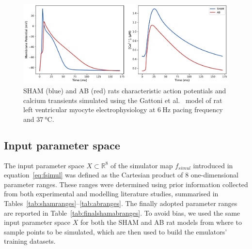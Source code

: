 \begin{figure}[ht!]
    \myfloatalign
    \includegraphics[width=\textwidth]{figures/chapter02/sham_vs_ab_ca_ap.pdf}
    \caption{SHAM (blue) and AB (red) rats characteristic action potentials and calcium transients simulated using the Gattoni et al.~\cite{Gattoni:2017} model of rat left ventricular myocyte electrophysiology at $\SI{6}{\hertz}$ pacing frequency and $\SI{37}{\celsius}$.}
    \label{fig:shamvsabcaap}
\end{figure}


%
%
%
\subsection{Input parameter space}\label{sec:ch4inputparameterspace}
The input parameter space $X\subset\mathbb{R}^{8}$ of the simulator map $f_{simul}$ introduced in equation~\eqref{eq:fsimul} was defined as the Cartesian product of $8$ one-dimensional parameter ranges. These ranges were determined using prior information collected from both experimental and modelling literature studies, summarised in Tables~\ref{tab:shamranges}--\ref{tab:abranges}. The finally adopted parameter ranges are reported in Table~\ref{tab:finalshamabranges}. To avoid bias, we used the same input parameter space $X$ for both the SHAM and AB rat models from where to sample points to be simulated, which are then used to build the emulators' training datasets.

